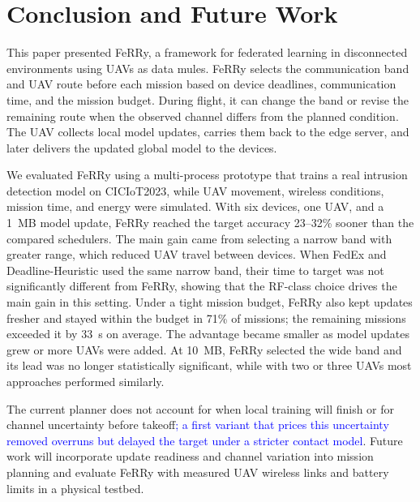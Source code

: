 \documentclass[conference]{IEEEtran}
\newcommand{\sysname}{FeRRy}
\begin{document}
\section{Conclusion and Future Work}
\label{sec:conclusion}

This paper presented \sysname{}, a framework for federated learning in
disconnected environments using UAVs as data mules. \sysname{} selects the
communication band and UAV route before each mission based on device deadlines,
communication time, and the mission budget. During flight, it can change the
band or revise the remaining route when the observed channel differs from the
planned condition. The UAV collects local model updates, carries them back to
the edge server, and later delivers the updated global model to the devices.

We evaluated \sysname{} using a multi-process prototype that trains a real
intrusion detection model on CICIoT2023, while UAV movement, wireless
conditions, mission time, and energy were simulated. With six devices, one UAV,
and a 1~MB model update, \sysname{} reached the target accuracy 23--32\% sooner
than the compared schedulers. The main gain came from selecting a narrow band
with greater range, which reduced UAV travel between devices. When FedEx and
Deadline-Heuristic used the same narrow band, their time to target was not
significantly different from \sysname{}, showing that the RF-class choice
drives the main gain in this setting. Under a tight mission budget, \sysname{}
also kept updates fresher and stayed within the budget in 71\% of missions; the
remaining missions exceeded it by 33~s on average. The advantage became smaller
as model updates grew or more UAVs were added. At 10~MB, \sysname{} selected
the wide band and its lead was no longer statistically significant, while with
two or three UAVs most approaches performed similarly.

The current planner does not account for when local training will finish or for
channel uncertainty before takeoff\textcolor{blue}{; a first variant that prices
this uncertainty removed overruns but delayed the target under a stricter
contact model}. Future work will incorporate update readiness and channel
variation into mission planning and evaluate \sysname{} with measured UAV
wireless links and battery limits in a physical testbed.

\end{document}

